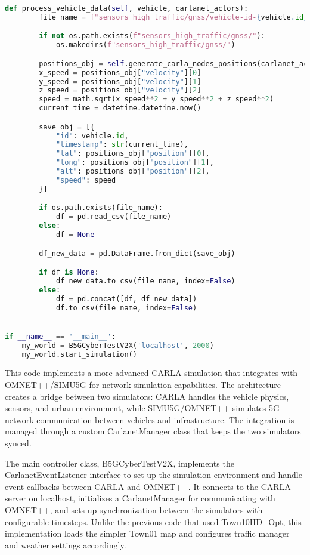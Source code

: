 \begin{lstlisting}[language=Python, caption={Simple data collection example, now using network simulation capabilities.},label={code:network}]
    def process_vehicle_data(self, vehicle, carlanet_actors):
        file_name = f"sensors_high_traffic/gnss/vehicle-id-{vehicle.id}.csv"

        if not os.path.exists(f"sensors_high_traffic/gnss/"):
            os.makedirs(f"sensors_high_traffic/gnss/")

        positions_obj = self.generate_carla_nodes_positions(carlanet_actors)[0]
        x_speed = positions_obj["velocity"][0]
        y_speed = positions_obj["velocity"][1]
        z_speed = positions_obj["velocity"][2]
        speed = math.sqrt(x_speed**2 + y_speed**2 + z_speed**2)
        current_time = datetime.datetime.now()

        save_obj = [{
            "id": vehicle.id,
            "timestamp": str(current_time),
            "lat": positions_obj["position"][0],
            "long": positions_obj["position"][1],
            "alt": positions_obj["position"][2],
            "speed": speed
        }]

        if os.path.exists(file_name):
            df = pd.read_csv(file_name)
        else:
            df = None

        df_new_data = pd.DataFrame.from_dict(save_obj)

        if df is None:
            df_new_data.to_csv(file_name, index=False)
        else:
            df = pd.concat([df, df_new_data])
            df.to_csv(file_name, index=False)


if __name__ == '__main__':
    my_world = B5GCyberTestV2X('localhost', 2000)
    my_world.start_simulation()
\end{lstlisting}

This code implements a more advanced CARLA simulation that integrates with OMNET++/SIMU5G for network simulation capabilities. The architecture creates a bridge between two simulators: CARLA handles the vehicle physics, sensors, and urban environment, while SIMU5G/OMNET++ simulates 5G network communication between vehicles and infrastructure. The integration is managed through a custom CarlanetManager class that keeps the two simulators synced.

The main controller class, B5GCyberTestV2X, implements the CarlanetEventListener interface to set up the simulation environment and handle event callbacks between CARLA and OMNET++. It connects to the CARLA server on localhost, initializes a CarlanetManager for communicating with OMNET++, and sets up synchronization between the simulators with configurable timesteps. Unlike the previous code that used Town10HD\_Opt, this implementation loads the simpler Town01 map and configures traffic manager and weather settings accordingly.

